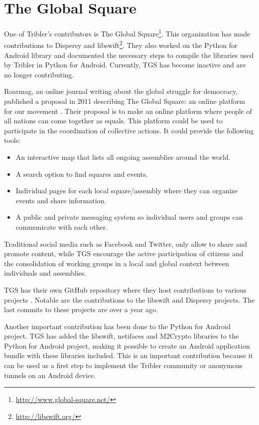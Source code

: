 \section{The Global Square}
	\label{sec:tgs}
	One of Tribler's contributors is The Global Square\footnote{\url{http://www.global-square.net/}}. This organization has made contributions to Dispersy and libswift\footnote{\url{http://libswift.org/}}. They also worked on the Python for Android library and documented the necessary steps to compile the libraries used by Tribler in Python for Android. Currently, TGS has become inactive and are no longer contributing.
	
	Roarmag, an online journal writing about the global struggle for democracy, published a proposal in 2011 describing The Global Square: an online platform for our movement \cite{theglobalsquare}. Their proposal is to make an online platform where people of all nations can come together as equals. This platform could be used to participate in the coordination of collective actions. It could provide the following tools:
	\begin{itemize}
		\item An interactive map that lists all ongoing assemblies around the world.
		\item A search option to find squares and events.
		\item Individual pages for each local square/assembly where they can organize events and share information.
		\item A public and private messaging system so individual users and groups can communicate with each other.
	\end{itemize}
	Traditional social media such as Facebook and Twitter, only allow to share and promote content, while TGS encourage the active participation of citizens and the consolidation of working groups in a local and global context between individuals and assemblies.
	
	TGS has their own GitHub repository where they host contributions to various projects \cite{theglobalsquaregithub}. Notable are the contributions to the libswift and Dispersy projects. The last commits to these projects are over a year ago.
		
	Another important contribution has been done to the Python for Android project. TGS has added the libswift, netifaces and M2Crypto libraries to the Python for Android project, making it possible to create an Android application bundle with these libraries included. This is an important contribution because it can be used as a first step to implement the Tribler community or anonymous tunnels on an Android device.

